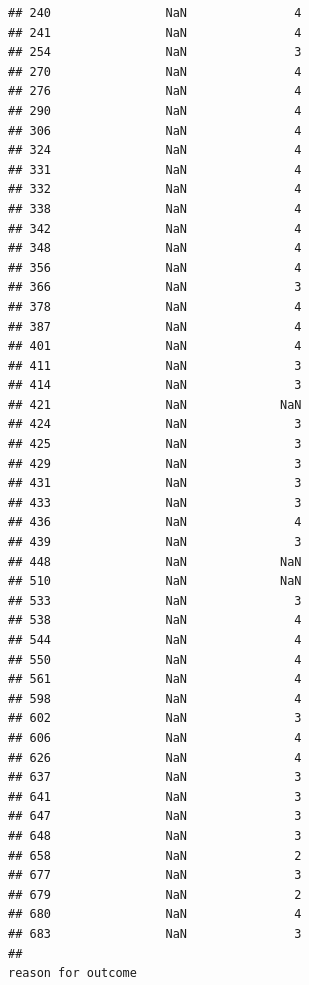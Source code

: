 \documentclass[
]{article}
\begin{document}
\begin{verbatim}
## 240                NaN               4
## 241                NaN               4
## 254                NaN               3
## 270                NaN               4
## 276                NaN               4
## 290                NaN               4
## 306                NaN               4
## 324                NaN               4
## 331                NaN               4
## 332                NaN               4
## 338                NaN               4
## 342                NaN               4
## 348                NaN               4
## 356                NaN               4
## 366                NaN               3
## 378                NaN               4
## 387                NaN               4
## 401                NaN               4
## 411                NaN               3
## 414                NaN               3
## 421                NaN             NaN
## 424                NaN               3
## 425                NaN               3
## 429                NaN               3
## 431                NaN               3
## 433                NaN               3
## 436                NaN               4
## 439                NaN               3
## 448                NaN             NaN
## 510                NaN             NaN
## 533                NaN               3
## 538                NaN               4
## 544                NaN               4
## 550                NaN               4
## 561                NaN               4
## 598                NaN               4
## 602                NaN               3
## 606                NaN               4
## 626                NaN               4
## 637                NaN               3
## 641                NaN               3
## 647                NaN               3
## 648                NaN               3
## 658                NaN               2
## 677                NaN               3
## 679                NaN               2
## 680                NaN               4
## 683                NaN               3
##                                                                                                                                                                                                                                                                                                                                                                                                                                                                                                                                                                                     reason for outcome

\end{verbatim}
\end{document}
